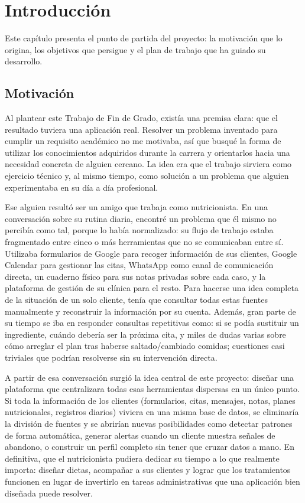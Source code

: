 \chapter{Introducción}
\label{cap:introduccion}


Este capítulo presenta el punto de partida del proyecto: la motivación que lo origina, los objetivos que persigue y el plan de trabajo que ha guiado su desarrollo.

\section{Motivación}
Al plantear este Trabajo de Fin de Grado, existía una premisa clara: que el resultado tuviera una aplicación real. Resolver un problema inventado para cumplir un requisito académico no me motivaba, así que busqué la forma de utilizar los conocimientos adquiridos durante la carrera y orientarlos hacia una necesidad concreta de alguien cercano. La idea era que el trabajo sirviera como ejercicio técnico y, al mismo tiempo, como solución a un problema que alguien experimentaba en su día a día profesional.

Ese alguien resultó ser un amigo que trabaja como nutricionista. En una conversación sobre su rutina diaria, encontré un problema que él mismo no percibía como tal, porque lo había normalizado: su flujo de trabajo estaba fragmentado entre cinco o más herramientas que no se comunicaban entre sí. Utilizaba formularios de Google para recoger información de sus clientes, Google Calendar para gestionar las citas, WhatsApp como canal de comunicación directa, un cuaderno físico para sus notas privadas sobre cada caso, y la plataforma de gestión de su clínica para el resto. Para hacerse una idea completa de la situación de un solo cliente, tenía que consultar todas estas fuentes manualmente y reconstruir la información por su cuenta. Además, gran parte de su tiempo se iba en responder consultas repetitivas como: si se podía sustituir un ingrediente, cuándo debería ser la próxima cita, y miles de dudas varias sobre cómo arreglar el plan tras haberse saltado/cambiado comidas; cuestiones casi triviales que podrían resolverse sin su intervención directa.

A partir de esa conversación surgió la idea central de este proyecto: diseñar una plataforma que centralizara todas esas herramientas dispersas en un único punto. Si toda la información de los clientes (formularios, citas, mensajes, notas, planes nutricionales, registros diarios) viviera en una misma base de datos, se eliminaría la división de fuentes y se abrirían nuevas posibilidades como detectar patrones de forma automática, generar alertas cuando un cliente muestra señales de abandono, o construir un perfil completo sin tener que cruzar datos a mano. En definitiva, que el nutricionista pudiera dedicar su tiempo a lo que realmente importa: diseñar dietas, acompañar a sus clientes y lograr que los tratamientos funcionen en lugar de invertirlo en tareas administrativas que una aplicación bien diseñada puede resolver.

